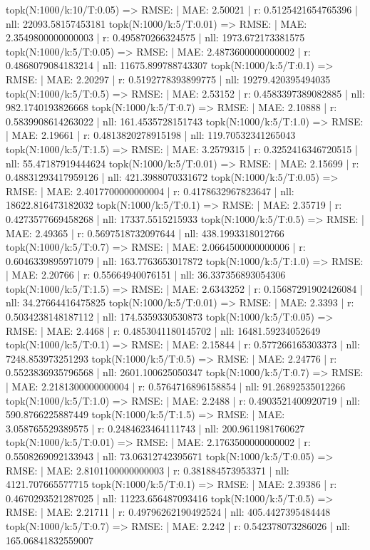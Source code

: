 topk(N:1000/k:10/T:0.05) => RMSE: | MAE: 2.50021 | r: 0.5125421654765396 | nll: 22093.58157453181
topk(N:1000/k:5/T:0.01) => RMSE: | MAE: 2.3549800000000003 | r: 0.495870266324575 | nll: 1973.672173381575
topk(N:1000/k:5/T:0.05) => RMSE: | MAE: 2.4873600000000002 | r: 0.4868079084183214 | nll: 11675.899788743307
topk(N:1000/k:5/T:0.1) => RMSE: | MAE: 2.20297 | r: 0.5192778393899775 | nll: 19279.420395494035
topk(N:1000/k:5/T:0.5) => RMSE: | MAE: 2.53152 | r: 0.4583397389082885 | nll: 982.1740193826668
topk(N:1000/k:5/T:0.7) => RMSE: | MAE: 2.10888 | r: 0.5839908614263022 | nll: 161.4535728151743
topk(N:1000/k:5/T:1.0) => RMSE: | MAE: 2.19661 | r: 0.4813820278915198 | nll: 119.70532341265043
topk(N:1000/k:5/T:1.5) => RMSE: | MAE: 3.2579315 | r: 0.3252416346720515 | nll: 55.47187919444624
topk(N:1000/k:5/T:0.01) => RMSE: | MAE: 2.15699 | r: 0.48831293417959126 | nll: 421.3988070331672
topk(N:1000/k:5/T:0.05) => RMSE: | MAE: 2.4017700000000004 | r: 0.4178632967823647 | nll: 18622.816473182032
topk(N:1000/k:5/T:0.1) => RMSE: | MAE: 2.35719 | r: 0.4273577669458268 | nll: 17337.5515215933
topk(N:1000/k:5/T:0.5) => RMSE: | MAE: 2.49365 | r: 0.5697518732097644 | nll: 438.1993318012766
topk(N:1000/k:5/T:0.7) => RMSE: | MAE: 2.0664500000000006 | r: 0.6046339895971079 | nll: 163.7763653017872
topk(N:1000/k:5/T:1.0) => RMSE: | MAE: 2.20766 | r: 0.55664940076151 | nll: 36.337356893054306
topk(N:1000/k:5/T:1.5) => RMSE: | MAE: 2.6343252 | r: 0.15687291902426084 | nll: 34.27664416475825
topk(N:1000/k:5/T:0.01) => RMSE: | MAE: 2.3393 | r: 0.5034238148187112 | nll: 174.5359330530873
topk(N:1000/k:5/T:0.05) => RMSE: | MAE: 2.4468 | r: 0.4853041180145702 | nll: 16481.59234052649
topk(N:1000/k:5/T:0.1) => RMSE: | MAE: 2.15844 | r: 0.577266165303373 | nll: 7248.853973251293
topk(N:1000/k:5/T:0.5) => RMSE: | MAE: 2.24776 | r: 0.5523836935796568 | nll: 2601.100625050347
topk(N:1000/k:5/T:0.7) => RMSE: | MAE: 2.2181300000000004 | r: 0.5764716896158854 | nll: 91.26892535012266
topk(N:1000/k:5/T:1.0) => RMSE: | MAE: 2.2488 | r: 0.4903521400920719 | nll: 590.8766225887449
topk(N:1000/k:5/T:1.5) => RMSE: | MAE: 3.058765529389575 | r: 0.2484623464111743 | nll: 200.9611981760627
topk(N:1000/k:5/T:0.01) => RMSE: | MAE: 2.1763500000000002 | r: 0.5508269092133943 | nll: 73.06312742395671
topk(N:1000/k:5/T:0.05) => RMSE: | MAE: 2.8101100000000003 | r: 0.381884573953371 | nll: 4121.707665577715
topk(N:1000/k:5/T:0.1) => RMSE: | MAE: 2.39386 | r: 0.4670293521287025 | nll: 11223.656487093416
topk(N:1000/k:5/T:0.5) => RMSE: | MAE: 2.21711 | r: 0.49796262190492524 | nll: 405.4427395484448
topk(N:1000/k:5/T:0.7) => RMSE: | MAE: 2.242 | r: 0.542378073286026 | nll: 165.06841832559007
